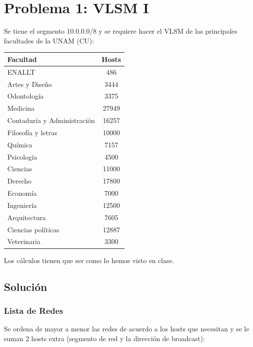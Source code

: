\section{Problema 1: VLSM I}

\begin{tcolorbox}[enunciado]
Se tiene el segmento 10.0.0.0/8 y se requiere hacer el VLSM de las principales facultades de la UNAM (CU):

\vspace{0.3cm}
\begin{center}
    \begin{tabular}{lc}
    \toprule
    \textbf{Facultad} & \textbf{Hosts} \\
    \midrule
    ENALLT & 486 \\
    Artes y Diseño & 3444 \\
    Odontología & 3375 \\
    Medicina & 27949 \\
    Contaduría y Administración & 16257 \\
    Filosofía y letras & 10000 \\
    Química & 7157 \\
    Psicología & 4500 \\
    Ciencias & 11000 \\
    Derecho & 17800 \\
    Economía & 7000 \\
    Ingeniería & 12500 \\
    Arquitectura & 7605 \\
    Ciencias políticas & 12887 \\
    Veterinaria & 3300 \\
    \bottomrule
    \end{tabular}
\end{center}
\vspace{0.3cm}

Los cálculos tienen que ser como lo hemos visto en clase.
\end{tcolorbox}

\subsection*{Solución}
\subsubsection*{Lista de Redes}
Se ordena de mayor a menor las redes de acuerdo a los hosts que necesitan y se le suman 2 hosts extra (segmento de red y la dirección de broadcast):

